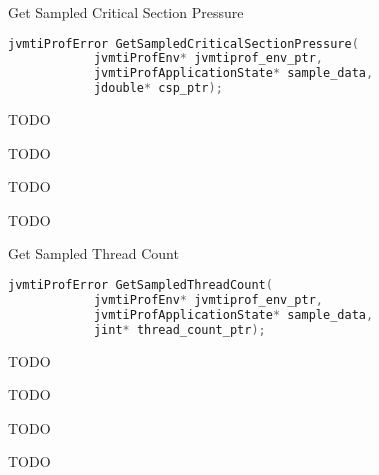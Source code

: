 \begin{apidef}{Get Sampled Critical Section Pressure}
\begin{lstlisting}[language=C]
jvmtiProfError GetSampledCriticalSectionPressure(
            jvmtiProfEnv* jvmtiprof_env_ptr,
            jvmtiProfApplicationState* sample_data,
            jdouble* csp_ptr);
\end{lstlisting}

\begin{apidesc}
TODO
\end{apidesc}

\begin{apiphase}
TODO
\end{apiphase}

\begin{apicap}
TODO
\end{apicap}

\begin{apiparam}
\end{apiparam}

\begin{apireturn}
TODO
\end{apireturn}

\begin{apierror}
\end{apierror}
\end{apidef}
\begin{apidef}{Get Sampled Thread Count}
\begin{lstlisting}[language=C]
jvmtiProfError GetSampledThreadCount(
            jvmtiProfEnv* jvmtiprof_env_ptr,
            jvmtiProfApplicationState* sample_data,
            jint* thread_count_ptr);
\end{lstlisting}

\begin{apidesc}
TODO
\end{apidesc}

\begin{apiphase}
TODO
\end{apiphase}

\begin{apicap}
TODO
\end{apicap}

\begin{apiparam}
\end{apiparam}

\begin{apireturn}
TODO
\end{apireturn}

\begin{apierror}
\end{apierror}
\end{apidef}
